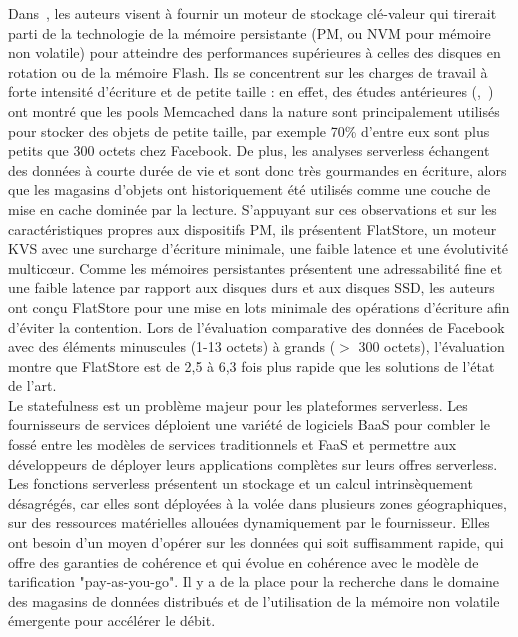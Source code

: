 Dans~\cite{Chen2020FlatStoreAE}, les auteurs visent à fournir un moteur de stockage clé-valeur qui tirerait parti de la technologie de la mémoire persistante (PM, ou NVM pour mémoire non volatile) pour atteindre des performances supérieures à celles des disques en rotation ou de la mémoire Flash. Ils se concentrent sur les charges de travail à forte intensité d'écriture et de petite taille : en effet, des études antérieures (\cite{atikoglu2012WorkloadAnalysis},~\cite{rajesh2013Memcache}) ont montré que les pools Memcached dans la nature sont principalement utilisés pour stocker des objets de petite taille, par exemple 70\% d'entre eux sont plus petits que 300 octets chez Facebook. De plus, les analyses serverless échangent des données à courte durée de vie et sont donc très gourmandes en écriture, alors que les magasins d'objets ont historiquement été utilisés comme une couche de mise en cache dominée par la lecture. S'appuyant sur ces observations et sur les caractéristiques propres aux dispositifs PM, ils présentent FlatStore, un moteur KVS avec une surcharge d'écriture minimale, une faible latence et une évolutivité multicœur. Comme les mémoires persistantes présentent une adressabilité fine et une faible latence par rapport aux disques durs et aux disques SSD, les auteurs ont conçu FlatStore pour une mise en lots minimale des opérations d'écriture afin d'éviter la contention. Lors de l'évaluation comparative des données de Facebook avec des éléments minuscules (1-13 octets) à grands ($>$ 300 octets), l'évaluation montre que FlatStore est de 2,5 à 6,3 fois plus rapide que les solutions de l'état de l'art.
\\

Le statefulness est un problème majeur pour les plateformes serverless. Les fournisseurs de services déploient une variété de logiciels BaaS pour combler le fossé entre les modèles de services traditionnels et FaaS et permettre aux développeurs de déployer leurs applications complètes sur leurs offres serverless. Les fonctions serverless présentent un stockage et un calcul intrinsèquement désagrégés, car elles sont déployées à la volée dans plusieurs zones géographiques, sur des ressources matérielles allouées dynamiquement par le fournisseur. Elles ont besoin d'un moyen d'opérer sur les données qui soit suffisamment rapide, qui offre des garanties de cohérence et qui évolue en cohérence avec le modèle de tarification "pay-as-you-go". Il y a de la place pour la recherche dans le domaine des magasins de données distribués et de l'utilisation de la mémoire non volatile émergente pour accélérer le débit.

